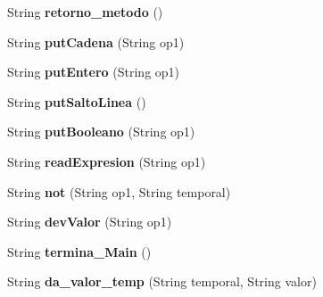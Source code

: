 \begin{DoxyCompactItemize}
\item 
\hypertarget{classcompilationunit_1_1_tercetos_aba991f6d17bc64d2ffc15c0095ea3af0}{
String {\bfseries retorno\_\-metodo} ()}
\label{classcompilationunit_1_1_tercetos_aba991f6d17bc64d2ffc15c0095ea3af0}

\item 
\hypertarget{classcompilationunit_1_1_tercetos_abeb610cf18f454607f8be0af32661fca}{
String {\bfseries putCadena} (String op1)}
\label{classcompilationunit_1_1_tercetos_abeb610cf18f454607f8be0af32661fca}

\item 
\hypertarget{classcompilationunit_1_1_tercetos_a06d29250a6285315eb244f55be96b07f}{
String {\bfseries putEntero} (String op1)}
\label{classcompilationunit_1_1_tercetos_a06d29250a6285315eb244f55be96b07f}

\item 
\hypertarget{classcompilationunit_1_1_tercetos_ad72c9a74a8be43920df799e0852ed1ce}{
String {\bfseries putSaltoLinea} ()}
\label{classcompilationunit_1_1_tercetos_ad72c9a74a8be43920df799e0852ed1ce}

\item 
\hypertarget{classcompilationunit_1_1_tercetos_a3709bba0826f017a1c0d83060cb592ba}{
String {\bfseries putBooleano} (String op1)}
\label{classcompilationunit_1_1_tercetos_a3709bba0826f017a1c0d83060cb592ba}

\item 
\hypertarget{classcompilationunit_1_1_tercetos_a30e8e2bcedcb06dbabb49728dcfecfa6}{
String {\bfseries readExpresion} (String op1)}
\label{classcompilationunit_1_1_tercetos_a30e8e2bcedcb06dbabb49728dcfecfa6}

\item 
\hypertarget{classcompilationunit_1_1_tercetos_af56568c8d4d6b8195478b53fff05831a}{
String {\bfseries not} (String op1, String temporal)}
\label{classcompilationunit_1_1_tercetos_af56568c8d4d6b8195478b53fff05831a}

\item 
\hypertarget{classcompilationunit_1_1_tercetos_aa8d3fec113fbe5feccdc342adad493f1}{
String {\bfseries devValor} (String op1)}
\label{classcompilationunit_1_1_tercetos_aa8d3fec113fbe5feccdc342adad493f1}

\item 
\hypertarget{classcompilationunit_1_1_tercetos_a7fe30693df2d92679d4e002d2fef6ef4}{
String {\bfseries termina\_\-Main} ()}
\label{classcompilationunit_1_1_tercetos_a7fe30693df2d92679d4e002d2fef6ef4}

\item 
\hypertarget{classcompilationunit_1_1_tercetos_ac5699732cacc55f5ee1a6169374ee556}{
String {\bfseries da\_\-valor\_\-temp} (String temporal, String valor)}
\label{classcompilationunit_1_1_tercetos_ac5699732cacc55f5ee1a6169374ee556}

\end{DoxyCompactItemize}

